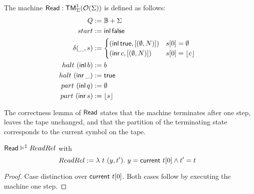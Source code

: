 \begin{definition}[$\MS{Read}$][ReadChar]
  The machine $\mathsf{Read} : \mathsf{TM}_\Sigma^1(\mathcal{O}(\Sigma))$ is defined as follows:
  \begin{align*}
    Q          &:= \mathbb{B}+\Sigma \\
    start      &:= \operatorname{\mathsf{inl}} \mathsf{false} \\
    \delta (\_, s) &:=
                     \begin{cases}
                       (\operatorname{\mathsf{inl}} \mathsf{true}, \left[ (\emptyset, N) \right]) & s[0] = \emptyset \\
                       (\operatorname{\mathsf{inr}} c, \left[ (\emptyset, N) \right])     & s[0] = \left\lfloor {c} \right\rfloor
                     \end{cases} \\
    halt   ~ (\operatorname{\mathsf{inl}}  b) &:= b \\
    halt   ~ (\operatorname{\mathsf{inr}} \_) &:= \mathsf{true} \\
    part   ~ (\operatorname{\mathsf{inl}}  q) &:= \emptyset \\
    part   ~ (\operatorname{\mathsf{inr}}  s) &:= \left\lfloor {s} \right\rfloor
  \end{align*}
\end{definition}

The correctness lemma of $\MS{Read}$ states that the machine terminates after one step, leaves the tape unchanged, and that the partition of the
terminating state corresponds to the current symbol on the tape.

\begin{lemma}
  \label{lem:Read_Sem} $\mathsf{Read} \mathrel{\vDash^{1}} ReadRel$ with
  \[
    ReadRel := \lambda~t~(y,t').~ y = \mathsf{current}~t[0] \land t' = t
  \]
\end{lemma}
\begin{proof}
  Case distinction over $\mathsf{current}~t[0]$.  Both cases follow by executing the machine one step.
\end{proof}



